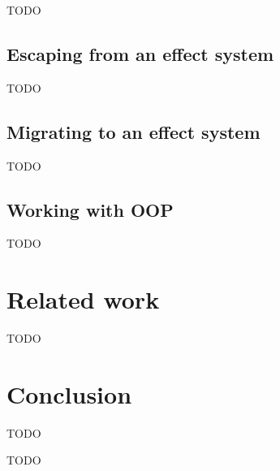 \documentclass[acmsmall]{acmart}
\begin{document}

TODO %

\subsection{Escaping from an effect system}




TODO %

\subsection{Migrating to an effect system}

TODO %

\subsection{Working with OOP}

TODO %




\section{Related work} \label{sec:related}



TODO %



\section{Conclusion} \label{sec:conclusion}

TODO %


\begin{acks}
    TODO %
\end{acks}




\end{document}
